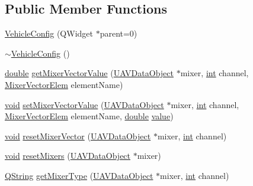 \subsection*{Public Member Functions}
\begin{DoxyCompactItemize}
\item 
\hyperlink{group___config_plugin_ga369dba1a2bcda89963b25078cbf89fd9}{Vehicle\-Config} (Q\-Widget $\ast$parent=0)
\item 
\hyperlink{group___config_plugin_ga440451fa05e53fc37b5dfafc439cd681}{$\sim$\-Vehicle\-Config} ()
\item 
\hyperlink{_super_l_u_support_8h_a8956b2b9f49bf918deed98379d159ca7}{double} \hyperlink{group___config_plugin_ga0d65103b0dfd7aa3d3fca584cdda0a3f}{get\-Mixer\-Vector\-Value} (\hyperlink{class_u_a_v_data_object}{U\-A\-V\-Data\-Object} $\ast$mixer, \hyperlink{ioapi_8h_a787fa3cf048117ba7123753c1e74fcd6}{int} channel, \hyperlink{group___config_plugin_ga819f8f1846be72af33b5c567259335fe}{Mixer\-Vector\-Elem} element\-Name)
\item 
\hyperlink{group___u_a_v_objects_plugin_ga444cf2ff3f0ecbe028adce838d373f5c}{void} \hyperlink{group___config_plugin_ga1c43f32f9f928991460ed7491d048ca1}{set\-Mixer\-Vector\-Value} (\hyperlink{class_u_a_v_data_object}{U\-A\-V\-Data\-Object} $\ast$mixer, \hyperlink{ioapi_8h_a787fa3cf048117ba7123753c1e74fcd6}{int} channel, \hyperlink{group___config_plugin_ga819f8f1846be72af33b5c567259335fe}{Mixer\-Vector\-Elem} element\-Name, \hyperlink{_super_l_u_support_8h_a8956b2b9f49bf918deed98379d159ca7}{double} \hyperlink{glext_8h_aa0e2e9cea7f208d28acda0480144beb0}{value})
\item 
\hyperlink{group___u_a_v_objects_plugin_ga444cf2ff3f0ecbe028adce838d373f5c}{void} \hyperlink{group___config_plugin_ga0e4c15b064550ea0899ed4e641ebb635}{reset\-Mixer\-Vector} (\hyperlink{class_u_a_v_data_object}{U\-A\-V\-Data\-Object} $\ast$mixer, \hyperlink{ioapi_8h_a787fa3cf048117ba7123753c1e74fcd6}{int} channel)
\item 
\hyperlink{group___u_a_v_objects_plugin_ga444cf2ff3f0ecbe028adce838d373f5c}{void} \hyperlink{group___config_plugin_ga2d8c952fda6b946cc3e0d184830c16f4}{reset\-Mixers} (\hyperlink{class_u_a_v_data_object}{U\-A\-V\-Data\-Object} $\ast$mixer)
\item 
\hyperlink{group___u_a_v_objects_plugin_gab9d252f49c333c94a72f97ce3105a32d}{Q\-String} \hyperlink{group___config_plugin_ga701b45580113989b2875514df233a598}{get\-Mixer\-Type} (\hyperlink{class_u_a_v_data_object}{U\-A\-V\-Data\-Object} $\ast$mixer, \hyperlink{ioapi_8h_a787fa3cf048117ba7123753c1e74fcd6}{int} channel)

\end{DoxyCompactItemize}

